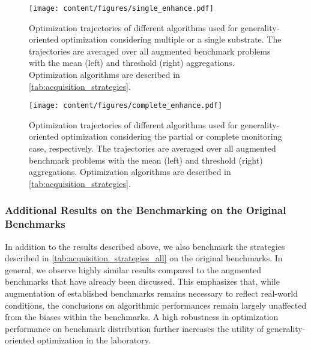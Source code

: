 \begin{figure}[t]
    \centering
    \texttt{[image: content/figures/single\_enhance.pdf]}
    \caption{Optimization trajectories of different algorithms used for generality-oriented optimization considering multiple or a single substrate. The trajectories are averaged over all augmented benchmark problems with the mean (left) and threshold (right) aggregations. Optimization algorithms are described in \cref{tab:acquisition_strategies}.}
    \label{fig:results_benchmark_aug_single}
\end{figure}
\begin{figure}[t]
    \centering
    \texttt{[image: content/figures/complete\_enhance.pdf]}
    \caption{Optimization trajectories of different algorithms used for generality-oriented optimization considering the partial or complete monitoring case, respectively. The trajectories are averaged over all augmented benchmark problems with the mean (left) and threshold (right) aggregations. Optimization algorithms are described in \cref{tab:acquisition_strategies}.}
    \label{fig:results_benchmark_aug_complete}
\end{figure}

\subsubsection{Additional Results on the Benchmarking on the Original Benchmarks}\label{subsubsec:add_results_original}
In addition to the results described above, we also benchmark the strategies described in \cref{tab:acquisition_strategies_all} on the original benchmarks.
In general, we observe highly similar results compared to the augmented benchmarks that have already been discussed.
This emphasizes that, while augmentation of established benchmarks remains necessary to reflect real-world conditions, the conclusions on algorithmic performances remain largely unaffected from the biases within the benchmarks.
A high robustness in optimization performance on benchmark distribution further increases the utility of generality-oriented optimization in the laboratory.

